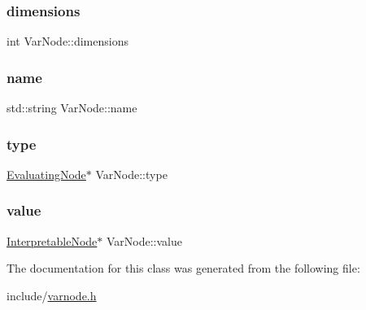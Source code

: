 \mbox{\label{classVarNode_a408a93fc558984318fb6fdad5cb36077}} 
\subsubsection{\texorpdfstring{dimensions}{dimensions}}
{\footnotesize\ttfamily int Var\+Node\+::dimensions}

\mbox{\label{classVarNode_adcfff85229e23fb0670fa3fc14b830e0}} 
\subsubsection{\texorpdfstring{name}{name}}
{\footnotesize\ttfamily std\+::string Var\+Node\+::name}

\mbox{\label{classVarNode_a8aff9f630482d9f8570dd9feb10849cd}} 
\subsubsection{\texorpdfstring{type}{type}}
{\footnotesize\ttfamily \hyperlink{classEvaluatingNode}{Evaluating\+Node}$\ast$ Var\+Node\+::type}

\mbox{\label{classVarNode_a58798cdece4226f1e0b844c8cbcd5146}} 
\subsubsection{\texorpdfstring{value}{value}}
{\footnotesize\ttfamily \hyperlink{classInterpretableNode}{Interpretable\+Node}$\ast$ Var\+Node\+::value}



The documentation for this class was generated from the following file\+:\begin{DoxyCompactItemize}
\item 
include/\hyperlink{varnode_8h}{varnode.\+h}\end{DoxyCompactItemize}

